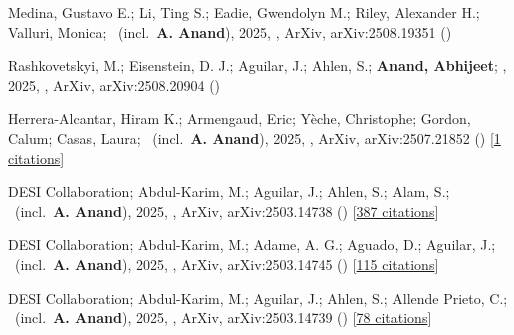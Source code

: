 \item[{\color{numcolor}\scriptsize8}] Medina, Gustavo E.; Li, Ting S.; Eadie, Gwendolyn M.; Riley, Alexander H.; Valluri, Monica; \etal\ (incl.\ \textbf{A. Anand}), 2025, , ArXiv, arXiv:2508.19351 ()

\item[{\color{numcolor}\scriptsize7}] Rashkovetskyi, M.; Eisenstein, D. J.; Aguilar, J.; Ahlen, S.; \textbf{Anand, Abhijeet}; \etal, 2025, , ArXiv, arXiv:2508.20904 ()

\item[{\color{numcolor}\scriptsize6}] Herrera-Alcantar, Hiram K.; Armengaud, Eric; Y{\`e}che, Christophe; Gordon, Calum; Casas, Laura; \etal\ (incl.\ \textbf{A. Anand}), 2025, , ArXiv, arXiv:2507.21852 () [\href{https://ui.adsabs.harvard.edu/abs/2025arXiv250721852H}{1 citations}]

\item[{\color{numcolor}\scriptsize5}] DESI Collaboration; Abdul-Karim, M.; Aguilar, J.; Ahlen, S.; Alam, S.; \etal\ (incl.\ \textbf{A. Anand}), 2025, , ArXiv, arXiv:2503.14738 () [\href{https://ui.adsabs.harvard.edu/abs/2025arXiv250314738D}{387 citations}]

\item[{\color{numcolor}\scriptsize4}] DESI Collaboration; Abdul-Karim, M.; Adame, A. G.; Aguado, D.; Aguilar, J.; \etal\ (incl.\ \textbf{A. Anand}), 2025, , ArXiv, arXiv:2503.14745 () [\href{https://ui.adsabs.harvard.edu/abs/2025arXiv250314745D}{115 citations}]

\item[{\color{numcolor}\scriptsize3}] DESI Collaboration; Abdul-Karim, M.; Aguilar, J.; Ahlen, S.; Allende Prieto, C.; \etal\ (incl.\ \textbf{A. Anand}), 2025, , ArXiv, arXiv:2503.14739 () [\href{https://ui.adsabs.harvard.edu/abs/2025arXiv250314739D}{78 citations}]

